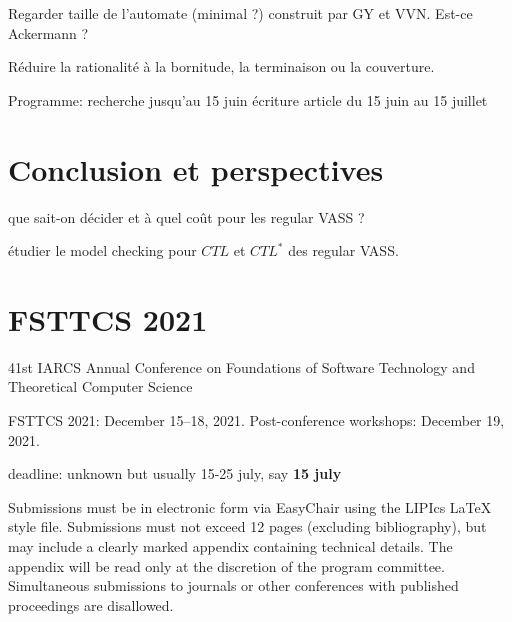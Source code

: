 \documentclass[a4paper,final]{article}
\theoremstyle{definition}
\begin{document}
Regarder taille de l'automate (minimal ?) construit par GY et VVN. Est-ce Ackermann ?

Réduire la rationalité à la bornitude, la terminaison ou la couverture.

Programme:
recherche jusqu'au 15 juin
écriture article du 15 juin au 15 juillet \\

\section{Conclusion et perspectives}
que sait-on décider et à quel coût pour les regular VASS ?

étudier le model checking pour  $CTL$  et $CTL^*$ des regular VASS.


\section{FSTTCS 2021}  
41st IARCS Annual Conference on
Foundations of Software Technology and Theoretical Computer Science

    FSTTCS 2021: December 15–18, 2021.
    Post-conference workshops: December 19, 2021.

deadline: unknown but usually 15-25 july, say {\bf 15 july}

Submissions must be in electronic form via EasyChair using the LIPIcs LaTeX style file. Submissions must not exceed 12 pages (excluding bibliography), but may include a clearly marked appendix containing technical details. The appendix will be read only at the discretion of the program committee. Simultaneous submissions to journals or other conferences with published proceedings are disallowed. 




\end{document}
